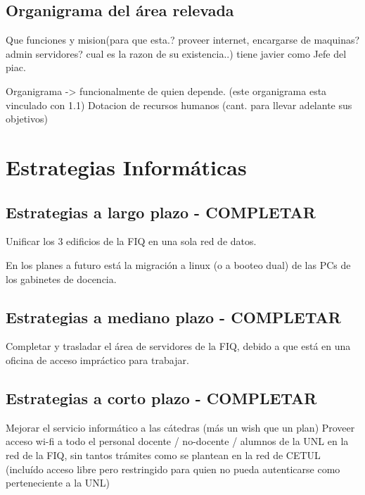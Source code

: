 \documentclass[10pt,a4paper,final]{article}
\begin{document}
\subsection{Organigrama del área relevada}

Que funciones y  mision(para que esta.? proveer internet, encargarse de maquinas? admin servidores? cual es la razon de su existencia..) tiene javier como Jefe del piac.

\begin{scriptsize}
    Organigrama -> funcionalmente de quien depende. (este organigrama esta vinculado con 1.1)
          Dotacion de recursos humanos (cant. para llevar adelante sus objetivos)
\end{scriptsize}

\section{Estrategias Informáticas}

\subsection{Estrategias a largo plazo - COMPLETAR}
Unificar los 3 edificios de la FIQ en una sola red de datos.

En los planes a futuro está la migración a linux (o a booteo dual) de las PCs de los gabinetes de docencia.

\subsection{Estrategias a mediano plazo - COMPLETAR}
Completar y trasladar el área de servidores de la FIQ, debido a que está en una oficina de acceso impráctico para trabajar.

\subsection{Estrategias a corto plazo - COMPLETAR}
Mejorar el servicio informático a las cátedras (más un wish que un plan)
Proveer acceso wi-fi a todo el personal docente / no-docente / alumnos de la UNL en la red de la FIQ, sin tantos trámites como se plantean en la red de CETUL (incluído acceso libre pero restringido para quien no pueda autenticarse como perteneciente a la UNL)
\end{document}
